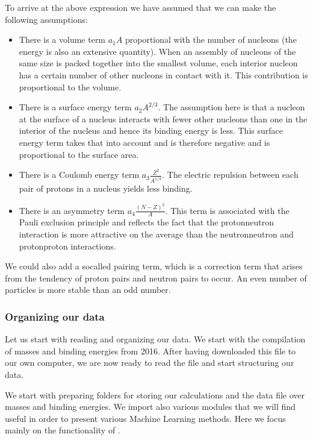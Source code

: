 \documentclass[letterpaper,10pt,english]{sphinxmanual}
\begin{document}
To arrive at the above expression we have assumed that we can make the following assumptions:
\begin{itemize}
\item {} 
There is a volume term \(a_1A\) proportional with the number of nucleons (the energy is also an extensive quantity). When an assembly of nucleons of the same size is packed together into the smallest volume, each interior nucleon has a certain number of other nucleons in contact with it. This contribution is proportional to the volume.

\item {} 
There is a surface energy term \(a_2A^{2/3}\). The assumption here is that a nucleon at the surface of a nucleus interacts with fewer other nucleons than one in the interior of the nucleus and hence its binding energy is less. This surface energy term takes that into account and is therefore negative and is proportional to the surface area.

\item {} 
There is a Coulomb energy term \(a_3\frac{Z^2}{A^{1/3}}\). The electric repulsion between each pair of protons in a nucleus yields less binding.

\item {} 
There is an asymmetry term \(a_4\frac{(N-Z)^2}{A}\). This term is associated with the Pauli exclusion principle and reflects the fact that the proton\sphinxhyphen{}neutron interaction is more attractive on the average than the neutron\sphinxhyphen{}neutron and proton\sphinxhyphen{}proton interactions.

\end{itemize}

We could also add a so\sphinxhyphen{}called pairing term, which is a correction term that
arises from the tendency of proton pairs and neutron pairs to
occur. An even number of particles is more stable than an odd number.


\subsubsection{Organizing our data}
\label{\detokenize{chapter3:organizing-our-data}}
Let us start with reading and organizing our data.
We start with the compilation of masses and binding energies from 2016.
After having downloaded this file to our own computer, we are now ready to read the file and start structuring our data.

We start with preparing folders for storing our calculations and the data file over masses and binding energies. We import also various modules that we will find useful in order to present various Machine Learning methods. Here we focus mainly on the functionality of .
\end{document}
